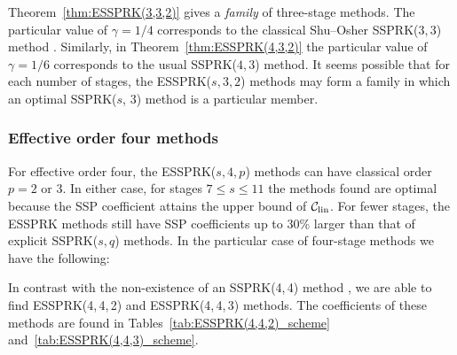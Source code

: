 Theorem~\ref{thm:ESSPRK(3,3,2)} gives a \emph{family} of three-stage 
methods. 
The particular value of $\gamma = 1/4$ corresponds to the classical
Shu--Osher SSPRK($3,3$) method \cite{Gottlieb/Shu:1998}.
Similarly, in Theorem~\ref{thm:ESSPRK(4,3,2)} the particular value of 
$\gamma = 1/6$ corresponds to the usual SSPRK($4,3$) method.
It seems possible that for each number of stages, the 
ESSPRK($s, 3, 2$) methods may form a family in which an optimal 
SSPRK($s$, $3$) method is a particular member. 

\subsubsection{Effective order four methods}\label{subsubsec:4th_ESSPRK}
For effective order four, the ESSPRK($s,4,p$) methods can have
classical order $p=2$ or $3$.
In either case, for stages $7 \le s \le 11$ the methods found are
optimal because the SSP coefficient attains the upper bound of
$\mathcal{C}_{\text{lin}}$.
For fewer stages, the ESSPRK methods still have SSP coefficients up to
30\% larger than that of explicit SSPRK($s,q$) methods.
In the particular case of four-stage methods we have the following:%
\begin{remark}
	In contrast with the non-existence of an SSPRK(4,\,4) method 
	\cite{Gottlieb/Shu:1998,Ruuth2002}, 
	we are able to find ESSPRK(4,\,4,\,2) and ESSPRK(4,\,4,\,3) methods.
	The coefficients of these methods are found in
	Tables~\ref{tab:ESSPRK(4,4,2)_scheme}
	and~\ref{tab:ESSPRK(4,4,3)_scheme}.
\end{remark}

